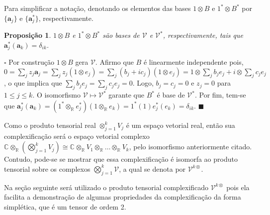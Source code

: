 \documentclass[12pt]{book}
\newtheorem{proposicao}[teorema]{Proposição}
\newenvironment{prova}[1]{$\square$ #1}{\hfill$\blacksquare$}
\newcommand{\complexificacaotensorial}[1]{\complexo{}\otimes_{\reta} #1}
\newcommand{\complexificado}[1]{\mathcal{#1}}
\newcommand{\complexificacaoelemento}[2]{#1\otimes_{\reta} #2}
\newcommand{\complexo}[1]{\mathbb{C}^{#1}}
\newcommand{\produtotensorialreal}[2]{\bigotimes_{j=1}^{#1} #2_{j}}
\newcommand{\real}[1]{\mathbb{R}^{#1}}
\newcommand{\reta}{\real{}}
\begin{document}
	Para simplificar a notação, denotando os elementos das bases $1\otimes B$ e $1^{*}\otimes B^{*}$ por $\{\textbf{a}_{j}\} $ e $\{\textbf{a}^{*}_{j}\}$, respectivamente.
	
	\begin{proposicao}\label{proposicao_base_complexificada}
		$1\otimes B$ e $1^{*}\otimes B^{*}$ são bases de $\complexificado{V}$ e $\complexificado{V}^{*}$, respectivamente, tais que $\textbf{a}^{*}_{j}(\textbf{a}_{k})=\delta_{ik}$.
	\end{proposicao}
	\begin{prova}
		Por construção $1\otimes B$ gera $\complexificado{V}$. Afirmo que $B$ é linearmente independente pois, $0=\sum_{j}z_{j}\textbf{a}_{j} = \sum_{j}z_{j}(1\otimes e_{j}) = \sum_{j}(b_{j} +ic_{j})(1\otimes e_{j}) = 1\otimes \sum_{j}b_{j}e_{j}+i\otimes \sum_{j}c_{j}e_{j}$, o que implica que $\sum_{j}b_{j}e_{j}=\sum_{j}c_{j}e_{j} = 0$. Logo, $b_{j}=c_{j}=0$  e $z_{j} = 0$ para $1\leq j\leq k$. O isomorfismo $\complexificado{V} \mapsto \complexificado{V}^{*}$ garante que $B^{*}$ é base de $\complexificado{V}^{*}$. Por fim, tem-se que $\textbf{a}^{*}_{j}(\textbf{a}_{k})=(\complexificacaoelemento{1^{*}}{e^{*}_{j}})(\complexificacaoelemento{1}{e_{k}}) = 1^{*}(1)e^{*}_{j}(e_{k}) = \delta_{ik}$.
	\end{prova}
	
	Como o produto tensorial real $\otimes_{j=1}^{k}V_{j}$ é um espaço vetorial real, então sua complexificação será o espaço vetorial complexo $\complexificacaotensorial{(\produtotensorialreal{k}{V})} \cong \complexificacaotensorial{V_{1} \otimes_{\reta} \dots \otimes_{\reta} V_{k}}$, pelo isomorfismo anteriormente citado. Contudo, pode-se se mostrar que essa complexificação é isomorfa ao produto tensorial sobre os complexos $\bigotimes^{k}_{j=1}\complexificado{V}$, a qual se denota por $\complexificado{V}^{k\otimes}$. 
	
	Na seção seguinte será utilizado o produto tensorial complexificado $\complexificado{V}^{k\otimes}$ pois ela facilita a demonstração de algumas propriedades da complexificação da forma simplética, que é um tensor de ordem 2.
	
\end{document}
